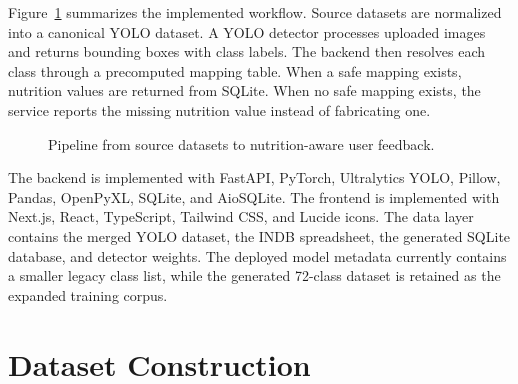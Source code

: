\documentclass[conference]{IEEEtran}
\begin{document}
Figure~\ref{fig:pipeline} summarizes the implemented workflow. Source datasets are normalized into a canonical YOLO dataset. A YOLO detector processes uploaded images and returns bounding boxes with class labels. The backend then resolves each class through a precomputed mapping table. When a safe mapping exists, nutrition values are returned from SQLite. When no safe mapping exists, the service reports the missing nutrition value instead of fabricating one.

\begin{figure}[t]
\centering
{}
\caption{Pipeline from source datasets to nutrition-aware user feedback.}
\label{fig:pipeline}
\end{figure}

The backend is implemented with FastAPI, PyTorch, Ultralytics YOLO, Pillow, Pandas, OpenPyXL, SQLite, and AioSQLite. The frontend is implemented with Next.js, React, TypeScript, Tailwind CSS, and Lucide icons. The data layer contains the merged YOLO dataset, the INDB spreadsheet, the generated SQLite database, and detector weights. The deployed model metadata currently contains a smaller legacy class list, while the generated 72-class dataset is retained as the expanded training corpus.

\section{Dataset Construction}
\end{document}
